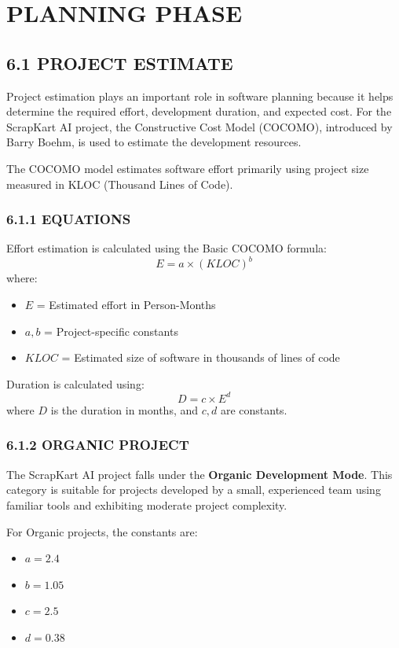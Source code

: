 \chapter{PLANNING PHASE}

\section{6.1 PROJECT ESTIMATE}
Project estimation plays an important role in software planning because it helps determine the required effort, development duration, and expected cost. For the ScrapKart AI project, the Constructive Cost Model (COCOMO), introduced by Barry Boehm, is used to estimate the development resources.

The COCOMO model estimates software effort primarily using project size measured in KLOC (Thousand Lines of Code). 

\subsection{6.1.1 EQUATIONS}
Effort estimation is calculated using the Basic COCOMO formula:
\[ E = a \times (KLOC)^b \]
where:
\begin{itemize}
    \item $E$ = Estimated effort in Person-Months
    \item $a, b$ = Project-specific constants
    \item $KLOC$ = Estimated size of software in thousands of lines of code
\end{itemize}

Duration is calculated using:
\[ D = c \times E^d \]
where $D$ is the duration in months, and $c, d$ are constants.

\subsection{6.1.2 ORGANIC PROJECT}
The ScrapKart AI project falls under the \textbf{Organic Development Mode}. This category is suitable for projects developed by a small, experienced team using familiar tools and exhibiting moderate project complexity.

For Organic projects, the constants are:
\begin{itemize}
    \item $a = 2.4$
    \item $b = 1.05$
    \item $c = 2.5$
    \item $d = 0.38$
\end{itemize}

